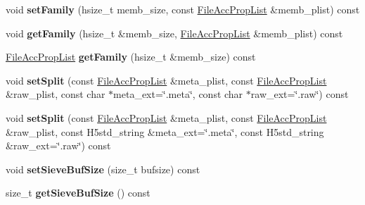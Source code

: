 \begin{DoxyCompactItemize}
void {\bfseries set\+Family} (hsize\+\_\+t memb\+\_\+size, const \hyperlink{class_h5_1_1_file_acc_prop_list}{File\+Acc\+Prop\+List} \&memb\+\_\+plist) const
\item 
\mbox{\label{class_h5_1_1_file_acc_prop_list_a99744f8672857352ae5da198f5909429}} 
void {\bfseries get\+Family} (hsize\+\_\+t \&memb\+\_\+size, \hyperlink{class_h5_1_1_file_acc_prop_list}{File\+Acc\+Prop\+List} \&memb\+\_\+plist) const
\item 
\mbox{\label{class_h5_1_1_file_acc_prop_list_a3a5842d09a2fcd1f45b65bc2cf465854}} 
\hyperlink{class_h5_1_1_file_acc_prop_list}{File\+Acc\+Prop\+List} {\bfseries get\+Family} (hsize\+\_\+t \&memb\+\_\+size) const
\item 
\mbox{\label{class_h5_1_1_file_acc_prop_list_aa0a43c3dc8721a1d7a9452bd7dfb0c5e}} 
void {\bfseries set\+Split} (const \hyperlink{class_h5_1_1_file_acc_prop_list}{File\+Acc\+Prop\+List} \&meta\+\_\+plist, const \hyperlink{class_h5_1_1_file_acc_prop_list}{File\+Acc\+Prop\+List} \&raw\+\_\+plist, const char $\ast$meta\+\_\+ext=\char`\"{}.meta\char`\"{}, const char $\ast$raw\+\_\+ext=\char`\"{}.raw\char`\"{}) const
\item 
\mbox{\label{class_h5_1_1_file_acc_prop_list_a683415966f42b90acfc326139355142d}} 
void {\bfseries set\+Split} (const \hyperlink{class_h5_1_1_file_acc_prop_list}{File\+Acc\+Prop\+List} \&meta\+\_\+plist, const \hyperlink{class_h5_1_1_file_acc_prop_list}{File\+Acc\+Prop\+List} \&raw\+\_\+plist, const H5std\+\_\+string \&meta\+\_\+ext=\char`\"{}.meta\char`\"{}, const H5std\+\_\+string \&raw\+\_\+ext=\char`\"{}.raw\char`\"{}) const
\item 
\mbox{\label{class_h5_1_1_file_acc_prop_list_a00064f32aea2943cbf3743b8aabdde33}} 
void {\bfseries set\+Sieve\+Buf\+Size} (size\+\_\+t bufsize) const
\item 
\mbox{\label{class_h5_1_1_file_acc_prop_list_a5fc1a9224b17dc4f3fe68b9d1475d26d}} 
size\+\_\+t {\bfseries get\+Sieve\+Buf\+Size} () const
\item 
\mbox{\label{class_h5_1_1_file_acc_prop_list_abd4a20b6b9397a4aa467a23644d91129}} 

\end{DoxyCompactItemize}
